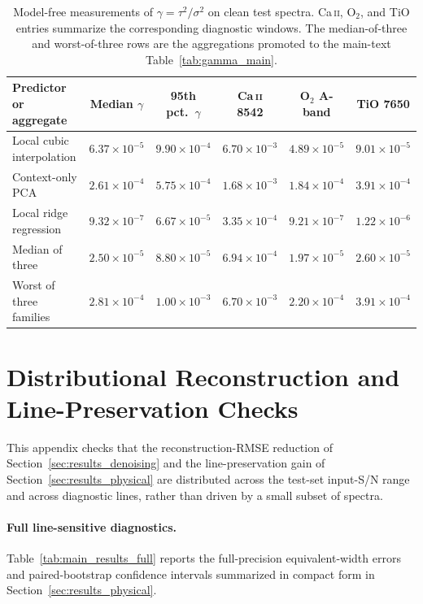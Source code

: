 \documentclass[twocolumn]{aastex7}
\begin{document}
\begin{table}[ht]
\centering
\small
\caption{Model-free measurements of $\gamma=\tau^{2}/\sigma^{2}$ on clean test spectra. Ca\,\textsc{ii}, O$_2$, and TiO entries summarize the corresponding diagnostic windows. The median-of-three and worst-of-three rows are the aggregations promoted to the main-text Table~\ref{tab:gamma_main}.}
\label{tab:gamma_full}
\begin{tabular}{lccccc}
\hline
Predictor or aggregate & Median $\gamma$ & 95th pct.\ $\gamma$ & Ca\,\textsc{ii} 8542 & O$_2$ A-band & TiO 7650 \\
\hline
Local cubic interpolation & $6.37\times10^{-5}$ & $9.90\times10^{-4}$ & $6.70\times10^{-3}$ & $4.89\times10^{-5}$ & $9.01\times10^{-5}$ \\
Context-only PCA & $2.61\times10^{-4}$ & $5.75\times10^{-4}$ & $1.68\times10^{-3}$ & $1.84\times10^{-4}$ & $3.91\times10^{-4}$ \\
Local ridge regression & $9.32\times10^{-7}$ & $6.67\times10^{-5}$ & $3.35\times10^{-4}$ & $9.21\times10^{-7}$ & $1.22\times10^{-6}$ \\
Median of three & $2.50\times10^{-5}$ & $8.80\times10^{-5}$ & $6.94\times10^{-4}$ & $1.97\times10^{-5}$ & $2.60\times10^{-5}$ \\
Worst of three families & $2.81\times10^{-4}$ & $1.00\times10^{-3}$ & $6.70\times10^{-3}$ & $2.20\times10^{-4}$ & $3.91\times10^{-4}$ \\
\hline
\end{tabular}
\end{table}

\section{Distributional Reconstruction and Line-Preservation Checks}
\label{app:line_addenda}

This appendix checks that the reconstruction-RMSE reduction of Section~\ref{sec:results_denoising} and the line-preservation gain of Section~\ref{sec:results_physical} are distributed across the test-set input-S/N range and across diagnostic lines, rather than driven by a small subset of spectra.

\paragraph{Full line-sensitive diagnostics.}
Table~\ref{tab:main_results_full} reports the full-precision equivalent-width errors and paired-bootstrap confidence intervals summarized in compact form in Section~\ref{sec:results_physical}.
\end{document}
